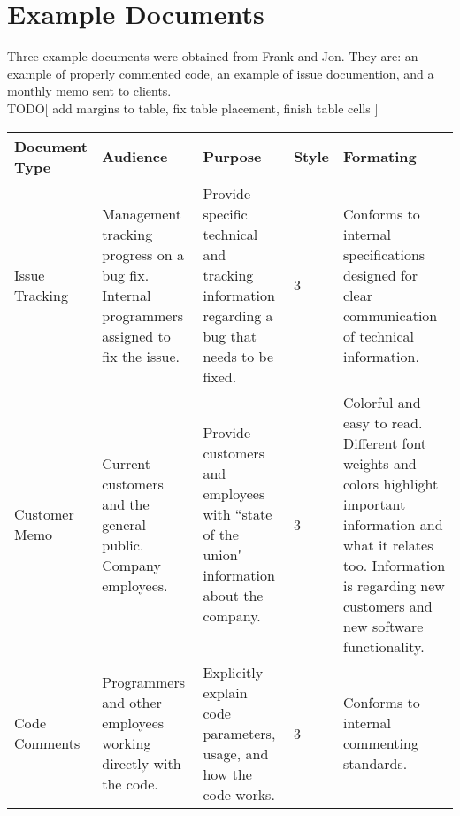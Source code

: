 \documentclass[prodmode,acmtecs]{acmsmall} %
\begin{document}
\section{Example Documents}\label{ex_documents}
Three example documents were obtained from Frank and Jon.  They are: an example of properly commented code, an example of issue documention, and a monthly memo sent to clients. \\
TODO[ add margins to table, fix table placement, finish table cells ]

\FloatBarrier

{\renewcommand{\arraystretch}{2}
\begin{table}[]
    \centering
    \begin{tabularx}{\textwidth}{ X | X | X | X | X }
        \hline
         Document Type & Audience  & Purpose & Style & Formating \\ \hline

        Issue \newline Tracking & Management tracking progress on a bug fix. \newline \newline Internal programmers assigned to fix the issue.  & Provide specific technical and tracking information regarding a bug that needs to be fixed. & 3 & Conforms to internal specifications designed for clear communication of technical information.  \\ \hline 

        Customer \newline Memo & Current customers and the general public. \newline \newline Company employees. & Provide customers and employees with ``state of the union" information about the company. & 3 & Colorful and easy to read. \newline \newline  Different font weights and colors highlight important information and what it relates too.  \newline \newline Information is regarding new customers and new software functionality.  \\ \hline
        
        Code \newline Comments & Programmers and other employees working directly with the code. & Explicitly explain code parameters, usage, and how the code works. & 3 &  Conforms to internal commenting standards. \\ \hline
    \end{tabularx}
\end{table}


}
\end{document}

